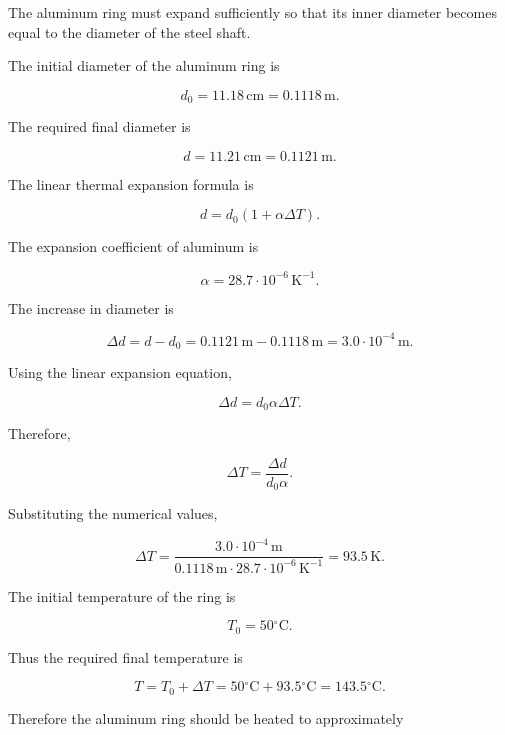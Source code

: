 \documentclass[letterpaper,12pt]{letter}
\begin{document}
\begin{enumerate}[label=\Roman*.]
\begin{enumerate}[label=\arabic*.]
\bigskip

\begin{center}
\end{center}

The aluminum ring must expand sufficiently so that its inner diameter becomes equal to the diameter of the steel shaft.

The initial diameter of the aluminum ring is

$$d_0=11.18\,\mathrm{cm}=0.1118\,\mathrm{m}.$$

The required final diameter is

$$d=11.21\,\mathrm{cm}=0.1121\,\mathrm{m}.$$

The linear thermal expansion formula is

$$d=d_0(1+\alpha\Delta T).$$

The expansion coefficient of aluminum is

$$\alpha=28.7\cdot10^{-6}\,\mathrm{K^{-1}}.$$

The increase in diameter is

$$\Delta d=d-d_0=0.1121\,\mathrm{m}-0.1118\,\mathrm{m}=3.0\cdot10^{-4}\,\mathrm{m}.$$

Using the linear expansion equation,

$$\Delta d=d_0\alpha\Delta T.$$

Therefore,

$$\Delta T=\frac{\Delta d}{d_0\alpha}.$$

Substituting the numerical values,

$$\Delta T=\frac{3.0\cdot10^{-4}\,\mathrm{m}}{0.1118\,\mathrm{m}\cdot28.7\cdot10^{-6}\,\mathrm{K^{-1}}}=93.5\,\mathrm{K}.$$

The initial temperature of the ring is

$$T_0=50{}^\circ\mathrm{C}.$$

Thus the required final temperature is

$$T=T_0+\Delta T=50{}^\circ\mathrm{C}+93.5{}^\circ\mathrm{C}=143.5{}^\circ\mathrm{C}.$$

Therefore the aluminum ring should be heated to approximately


\end{enumerate}
\end{enumerate}
\end{document}
